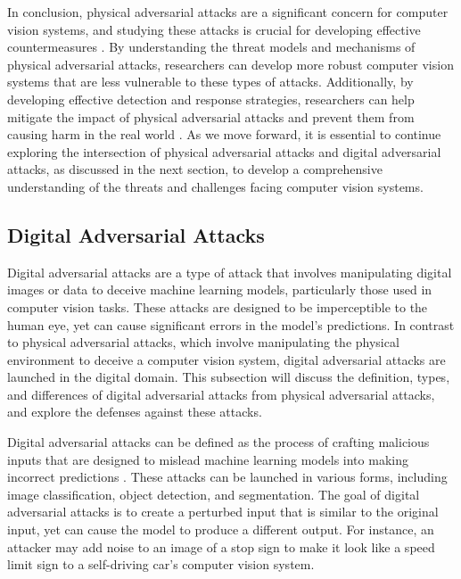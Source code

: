 \documentclass[11pt]{article}
\begin{document}
In conclusion, physical adversarial attacks are a significant concern for computer vision systems, and studying these attacks is crucial for developing effective countermeasures \cite{ref46}. By understanding the threat models and mechanisms of physical adversarial attacks, researchers can develop more robust computer vision systems that are less vulnerable to these types of attacks. Additionally, by developing effective detection and response strategies, researchers can help mitigate the impact of physical adversarial attacks and prevent them from causing harm in the real world \cite{ref47}. As we move forward, it is essential to continue exploring the intersection of physical adversarial attacks and digital adversarial attacks, as discussed in the next section, to develop a comprehensive understanding of the threats and challenges facing computer vision systems.

\subsection{Digital Adversarial Attacks}

Digital adversarial attacks are a type of attack that involves manipulating digital images or data to deceive machine learning models, particularly those used in computer vision tasks. These attacks are designed to be imperceptible to the human eye, yet can cause significant errors in the model's predictions. In contrast to physical adversarial attacks, which involve manipulating the physical environment to deceive a computer vision system, digital adversarial attacks are launched in the digital domain. This subsection will discuss the definition, types, and differences of digital adversarial attacks from physical adversarial attacks, and explore the defenses against these attacks.

Digital adversarial attacks can be defined as the process of crafting malicious inputs that are designed to mislead machine learning models into making incorrect predictions \cite{ref48}. These attacks can be launched in various forms, including image classification, object detection, and segmentation. The goal of digital adversarial attacks is to create a perturbed input that is similar to the original input, yet can cause the model to produce a different output. For instance, an attacker may add noise to an image of a stop sign to make it look like a speed limit sign to a self-driving car's computer vision system.
\end{document}
